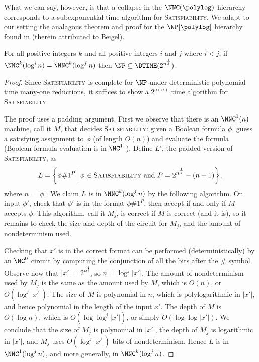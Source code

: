 \documentclass{article}
\begin{document}
What we can say, however, is that a collapse in the $\NNC(\polylog)$ hierarchy corresponds to a subexponential time algorithm for \textsc{Satisfiability}.
We adapt to our setting the analagous theorem and proof for the $\NP[\polylog]$ hierarchy found in \cite[Theorem~1]{dt90} (therein attributed to Beigel).
\begin{theorem}\label{thm:collapse}
  For all positive integers $k$ and all positive integers $i$ and $j$ where $i < j$, if $\NNC^k(\log^i n) = \NNC^k(\log^j n)$ then $\NP \subseteq \DTIME(2^{n^{\frac{i}{j}}})$.
\end{theorem}
\begin{proof}
  Since \textsc{Satisfiability} is complete for $\NP$ under deterministic polynomial time many-one reductions, it suffices to show a $2^{o(n)}$ time algorithm for \textsc{Satisfiability}.

  The proof uses a padding argument.
  First we observe that there is an $\NNC^1(n)$ machine, call it $M$, that decides \textsc{Satisfiability}: given a Boolean formula $\phi$, guess a satisfying assignment to $\phi$ (of length $O(n)$) and evaluate the formula (Boolean formula evaluation is in $\NC^1$ \cite{buss87}).
  Define $L'$, the padded version of \textsc{Satisfiability}, as
  \begin{equation*}
    L = \left\{ \phi \# 1^P \, \middle| \, \phi \in \textsc{Satisfiability} \text{ and } P = 2^{n^\frac{1}{j}} - (n + 1) \right\},
  \end{equation*}
  where $n = |\phi|$.
  We claim $L$ is in $\NNC^k(\log^j n)$ by the following algorithm.
  On input $\phi'$, check that $\phi'$ is in the format $\phi \# 1^P$, then accept if and only if $M$ accepts $\phi$.
  This algorithm, call it $M_j$, is correct if $M$ is correct (and it is), so it remains to check the size and depth of the circuit for $M_j$, and the amount of nondeterminism used.

  Checking that $x'$ is in the correct format can be performed (deterministically) by an $\NC^0$ circuit by computing the conjunction of all the bits after the $\#$ symbol.
  Observe now that $|x'| = 2^{n^{\frac{1}{j}}}$, so $n = \log^j{|x'|}$.
  The amount of nondeterminism used by $M_j$ is the same as the amount used by $M$, which is $O(n)$, or $O(\log^j |x'|)$.
  The size of $M$ is polynomial in $n$, which is polylogarithmic in $|x'|$, and hence polynomial in the length of the input $x'$.
  The depth of $M$ is $O(\log n)$, which is $O(\log \log^j |x'|)$, or simply $O(\log \log |x'|)$.
  We conclude that the size of $M_j$ is polynomial in $|x'|$, the depth of $M_j$ is logarithmic in $|x'|$, and $M_j$ uses $O(\log^j |x'|)$ bits of nondeterminism.
  Hence $L$ is in $\NNC^1(\log^j n)$, and more generally, in $\NNC^k(\log^j n)$.


\end{proof}
\end{document}
